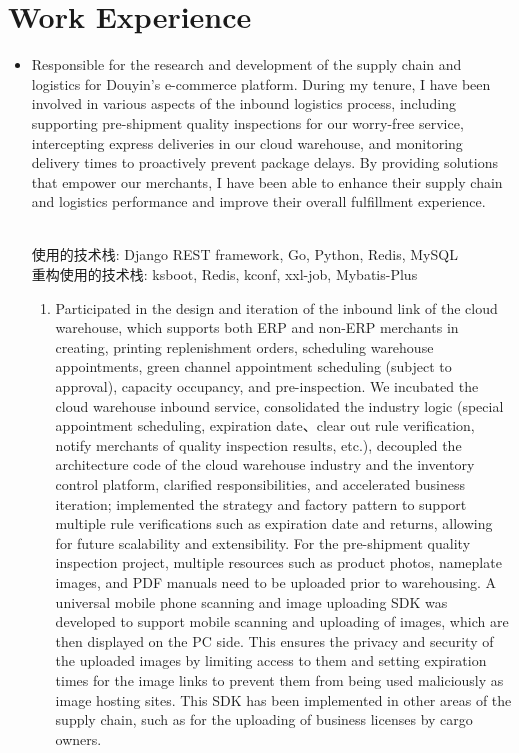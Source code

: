 \documentclass{resume}
\newcommand{\en}[1]{#1}
\newcommand{\zh}[1]{}
\begin{document}
\section{\en{Work Experience}\zh{工作经历}}
\en{}
\zh{\datedsubsection{\textbf{\href{https://www.kuaishou.com/about/}{快手，北京}}}{2022/03 -- 至今}}
\en{}
\zh{\rolewithdate{资源管理平台}{后端开发工程师}{2023/07 -- 至今}}
\begin{itemize}
     \item \en{Responsible for the research and development of the supply chain and logistics for Douyin's e-commerce platform. During my tenure, I have been involved in various aspects of the inbound logistics process, including supporting pre-shipment quality inspections for our worry-free service, intercepting express deliveries in our cloud warehouse, and monitoring delivery times to proactively prevent package delays. By providing solutions that empower our merchants, I have been able to enhance their supply chain and logistics performance and improve their overall fulfillment experience.}
           \zh{负责CMP多云管理平台的研发，期间参与公有云测试流程的设计与实现，华为云的接入，阿里云、腾讯云LB相关产品的接入与研发，同时参与平台运维，确保用户公有云体验优化与平台资源管理高效。}
           \\使用的技术栈: Django REST framework, Go, Python, Redis, MySQL\\
           重构使用的技术栈: ksboot, Redis, kconf, xxl-job, Mybatis-Plus
           \begin{enumerate}
                \item \en{Participated in the design and iteration of the inbound link of the cloud warehouse, which supports both ERP and non-ERP merchants in creating, printing replenishment orders, scheduling warehouse appointments, green channel appointment scheduling (subject to approval), capacity occupancy, and pre-inspection. We incubated the cloud warehouse inbound service, consolidated the industry logic (special appointment scheduling, expiration date、clear out rule verification, notify merchants of quality inspection results, etc.), decoupled the architecture code of the cloud warehouse industry and the inventory control platform, clarified responsibilities, and accelerated business iteration; implemented the strategy and factory pattern to support multiple rule verifications such as expiration date and returns, allowing for future scalability and extensibility. For the pre-shipment quality inspection project, multiple resources such as product photos, nameplate images, and PDF manuals need to be uploaded prior to warehousing. A universal mobile phone scanning and image uploading SDK was developed to support mobile scanning and uploading of images, which are then displayed on the PC side. This ensures the privacy and security of the uploaded images by limiting access to them and setting expiration times for the image links to prevent them from being used maliciously as image hosting sites. This SDK has been implemented in other areas of the supply chain, such as for the uploading of business licenses by cargo owners.}

\end{enumerate}
\end{itemize}
\end{document}
